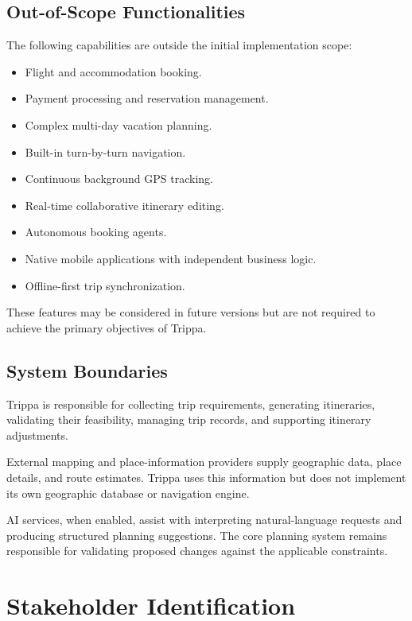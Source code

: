\endgroup


\subsection{Out-of-Scope Functionalities}

The following capabilities are outside the initial implementation scope:


\begin{itemize}
\item Flight and accommodation booking.
\item Payment processing and reservation management.
\item Complex multi-day vacation planning.
\item Built-in turn-by-turn navigation.
\item Continuous background GPS tracking.
\item Real-time collaborative itinerary editing.
\item Autonomous booking agents.
\item Native mobile applications with independent business logic.
\item Offline-first trip synchronization.
\end{itemize}


These features may be considered in future versions but are not required to achieve the primary objectives of Trippa.


\subsection{System Boundaries}

Trippa is responsible for collecting trip requirements, generating itineraries, validating their feasibility, managing trip records, and supporting itinerary adjustments.


External mapping and place-information providers supply geographic data, place details, and route estimates. Trippa uses this information but does not implement its own geographic database or navigation engine.


AI services, when enabled, assist with interpreting natural-language requests and producing structured planning suggestions. The core planning system remains responsible for validating proposed changes against the applicable constraints.


\section{Stakeholder Identification}

